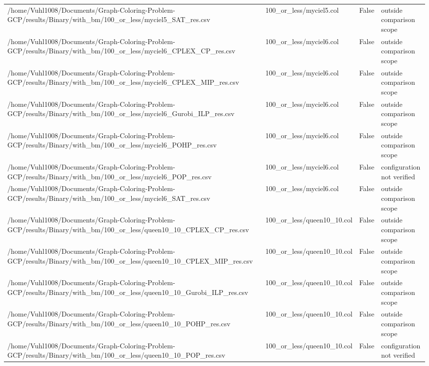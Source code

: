 \begin{table}[htbp]
\begin{tabular}{llll}
/home/Vuhl1008/Documents/Graph-Coloring-Problem-GCP/results/Binary/with\_bm/100\_or\_less/myciel5\_SAT\_res.csv & 100\_or\_less/myciel5.col & False & outside comparison scope \\
/home/Vuhl1008/Documents/Graph-Coloring-Problem-GCP/results/Binary/with\_bm/100\_or\_less/myciel6\_CPLEX\_CP\_res.csv & 100\_or\_less/myciel6.col & False & outside comparison scope \\
/home/Vuhl1008/Documents/Graph-Coloring-Problem-GCP/results/Binary/with\_bm/100\_or\_less/myciel6\_CPLEX\_MIP\_res.csv & 100\_or\_less/myciel6.col & False & outside comparison scope \\
/home/Vuhl1008/Documents/Graph-Coloring-Problem-GCP/results/Binary/with\_bm/100\_or\_less/myciel6\_Gurobi\_ILP\_res.csv & 100\_or\_less/myciel6.col & False & outside comparison scope \\
/home/Vuhl1008/Documents/Graph-Coloring-Problem-GCP/results/Binary/with\_bm/100\_or\_less/myciel6\_POHP\_res.csv & 100\_or\_less/myciel6.col & False & outside comparison scope \\
/home/Vuhl1008/Documents/Graph-Coloring-Problem-GCP/results/Binary/with\_bm/100\_or\_less/myciel6\_POP\_res.csv & 100\_or\_less/myciel6.col & False & configuration not verified \\
/home/Vuhl1008/Documents/Graph-Coloring-Problem-GCP/results/Binary/with\_bm/100\_or\_less/myciel6\_SAT\_res.csv & 100\_or\_less/myciel6.col & False & outside comparison scope \\
/home/Vuhl1008/Documents/Graph-Coloring-Problem-GCP/results/Binary/with\_bm/100\_or\_less/queen10\_10\_CPLEX\_CP\_res.csv & 100\_or\_less/queen10\_10.col & False & outside comparison scope \\
/home/Vuhl1008/Documents/Graph-Coloring-Problem-GCP/results/Binary/with\_bm/100\_or\_less/queen10\_10\_CPLEX\_MIP\_res.csv & 100\_or\_less/queen10\_10.col & False & outside comparison scope \\
/home/Vuhl1008/Documents/Graph-Coloring-Problem-GCP/results/Binary/with\_bm/100\_or\_less/queen10\_10\_Gurobi\_ILP\_res.csv & 100\_or\_less/queen10\_10.col & False & outside comparison scope \\
/home/Vuhl1008/Documents/Graph-Coloring-Problem-GCP/results/Binary/with\_bm/100\_or\_less/queen10\_10\_POHP\_res.csv & 100\_or\_less/queen10\_10.col & False & outside comparison scope \\
/home/Vuhl1008/Documents/Graph-Coloring-Problem-GCP/results/Binary/with\_bm/100\_or\_less/queen10\_10\_POP\_res.csv & 100\_or\_less/queen10\_10.col & False & configuration not verified \\

\end{tabular}
\end{table}
